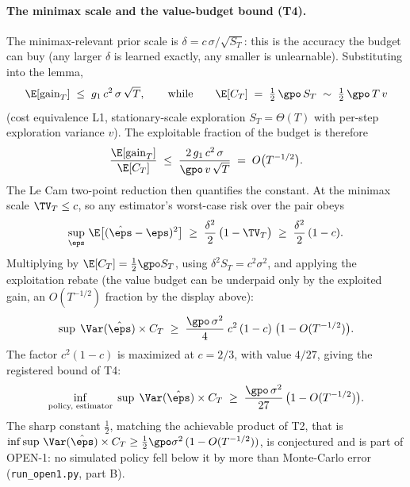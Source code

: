 \paragraph{The minimax scale and the value-budget bound (T4).}
The minimax-relevant prior scale is
$\delta = c\,\sigma/\sqrt{S_T}$: this is the accuracy the budget can buy
(any larger $\delta$ is learned exactly, any smaller is unlearnable).
Substituting into the lemma,
\begin{equation*}
\E[\mathrm{gain}_T] \;\le\; g_1\, c^2\,\sigma\,\sqrt{T},
\qquad\text{while}\qquad
\E[C_T] \;=\; \tfrac{1}{2}\,\gpo\, S_T \;\sim\; \tfrac{1}{2}\,\gpo\, T\, v
\end{equation*}
(cost equivalence L1, stationary-scale exploration $S_T=\Theta(T)$ with
per-step exploration variance $v$). The exploitable fraction of the budget
is therefore
\begin{equation*}
\frac{\E[\mathrm{gain}_T]}{\E[C_T]}
\;\le\; \frac{2\,g_1\,c^2\,\sigma}{\gpo\, v\,\sqrt{T}}
\;=\; O\big(T^{-1/2}\big).
\end{equation*}
The Le Cam two-point reduction then quantifies the constant. At the minimax
scale $\TV_T\le c$, so any estimator's worst-case risk over the pair obeys
\begin{equation*}
\sup_{\eps}\,\E\big[(\hat\eps-\eps)^2\big]
\;\ge\; \frac{\delta^2}{2}\,\big(1-\TV_T\big)
\;\ge\; \frac{\delta^2}{2}\,(1-c).
\end{equation*}
Multiplying by $\E[C_T]=\tfrac{1}{2}\gpo S_T$, using
$\delta^2 S_T = c^2\sigma^2$, and applying the exploitation rebate (the
value budget can be underpaid only by the exploited gain, an
$O(T^{-1/2})$ fraction by the display above):
\begin{equation*}
\sup\;\Var(\hat\eps)\times C_T
\;\ge\; \frac{\gpo\,\sigma^2}{4}\; c^2\,(1-c)\;
\big(1-O(T^{-1/2})\big).
\end{equation*}
The factor $c^2(1-c)$ is maximized at $c=2/3$, with value $4/27$, giving the
registered bound of T4:
\begin{equation*}
\inf_{\text{policy, estimator}}\;\sup\;\Var(\hat\eps)\times C_T
\;\ge\; \frac{\gpo\,\sigma^2}{27}\,\big(1-O(T^{-1/2})\big).
\end{equation*}
The sharp constant $\tfrac{1}{2}$, matching the achievable product of T2,
that is
$\inf\sup\,\Var(\hat\eps)\times C_T
\ge \tfrac{1}{2}\gpo\sigma^2\,(1-O(T^{-1/2}))$,
is conjectured and is part of OPEN-1: no simulated policy fell below it by
more than Monte-Carlo error (\texttt{run\_open1.py}, part B).


